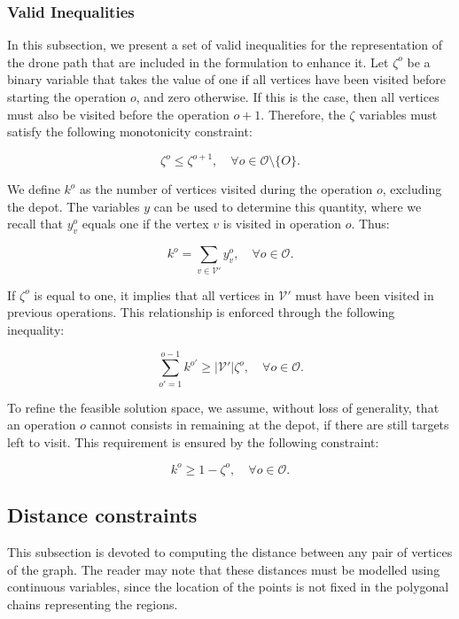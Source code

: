 \documentclass[12pt]{elsarticle}
\begin{document}
\subsubsection*{Valid Inequalities}
In this subsection, we present a set of valid inequalities for the representation of the drone path that are included in the formulation to enhance it. Let $\zeta^o$ be a binary variable that takes the value of one if all vertices have been visited before starting the operation $o$, and zero otherwise. If this is the case, then all vertices must also be visited before the operation $o+1$. Therefore, the $\zeta$ variables must satisfy the following monotonicity constraint:

\begin{equation}\label{eq:mon}\tag{Monotonicity}
\zeta^o\leq \zeta^{o+1},\quad\forall o\in\mathcal O\setminus\{O\}.
\end{equation}

We define $k^o$ as the number of vertices visited during the operation $o$, excluding the depot. The variables $y$ can be used to determine this quantity, where we recall that $y_v^{o}$ equals one if the vertex $v$ is visited in operation $o$. Thus:

\begin{equation}\label{eq:k}\tag{$k-C$}
k^o=\sum_{v\in\mathcal V'} y_{v}^o, \quad\forall o\in\mathcal O.
\end{equation}

If $\zeta^o$ is equal to one, it implies that all vertices in $\mathcal V'$ must have been visited in previous operations. This relationship is enforced through the following inequality:

\begin{equation}\label{eq:VI-1}\tag{$VI-C_1$}
\sum_{o'=1}^{o-1} k^{o'}\geq |\mathcal V'| \zeta^o,\quad\forall o\in\mathcal O.
\end{equation}

To refine the feasible solution space, we assume, without loss of generality, that an operation $o$ cannot consists in remaining at the depot, if there are still targets left to visit. This requirement is ensured by the following constraint:

\begin{equation}\label{eq:VI-2}\tag{$VI-C_2$}
k^o\geq 1-\zeta^o,\quad\forall o\in\mathcal O.
\end{equation}


\subsection{Distance constraints}
This subsection is devoted to computing the distance between any pair of vertices of the graph. The reader may note that these distances must be modelled using continuous variables, since the location of the points is not fixed in the polygonal chains representing the regions.
\end{document}
